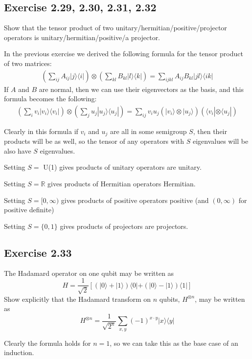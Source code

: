 \documentclass[]{article}
\newcommand{\bra}[1]{\langle #1 |}
\newcommand{\ket}[1]{| #1 \rangle}
\begin{document}
\subsection{Exercise 2.29, 2.30, 2.31, 2.32}
Show that the tensor product of two unitary/hermitian/positive/projector operators is unitary/hermitian/positive/a projector.

In the previous exercise we derived the following formula for the tensor product of two matrices:
\begin{align*}
\left(\sum_{ij}A_{ij}\ket{j}\bra{i}\right)
\otimes
\left(\sum_{kl}B_{kl}\ket{l}\bra{k}\right)
=
\sum_{ijkl}A_{ij}B_{kl} \ket{jl}\bra{ik}
\end{align*}
If $A$ and $B$ are normal, then we can use their eigenvectors as the basis, and this formula becomes the following:
\begin{align*}
\left(\sum_{i}v_i\ket{v_i}\bra{v_i}\right)
\otimes
\left(\sum_{j}u_j\ket{u_j}\bra{u_j}\right)
=
\sum_{ij}v_i u_j \left(\ket{v_i}\otimes\ket{u_j}\right) \left(\bra{v_i}\otimes\bra{u_j}\right)
\end{align*}

Clearly in this formula if $v_i$ and $u_j$ are all in some semigroup $S$, then their products will be as well, so the tensor of any operators with $S$ eigenvalues will be also have $S$ eigenvalues.

Setting $S =$ U(1) gives products of unitary operators are unitary.

Setting $S = \mathbb{R}$ gives products of Hermitian operators Hermitian.

Setting $S = [0, \infty)$ gives products of positive operators positive (and $(0, \infty)$ for positive definite)

Setting $S = \{0, 1\}$ gives products of projectors are projectors.
\subsection{Exercise 2.33}
The Hadamard operator on one qubit may be written as
\[H=\frac{1}{\sqrt{2}}\left[(\ket{0}+\ket{1})\bra{0}+(\ket{0}-\ket{1})\bra{1}\right]\]
Show explicitly that the Hadamard transform on $n$ qubits, $H^{\otimes n}$, may be written as 
\[H^{\otimes n}=\frac{1}{\sqrt{2^n}}\sum_{x,y}(-1)^{x \cdot y}\ket{x}\bra{y}\]

Clearly the formula holds for $n=1$, so we can take this as the base case of an induction.
\end{document}
